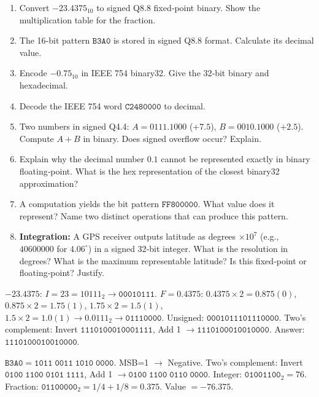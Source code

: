 \documentclass[11pt]{article}
\begin{document}
\begin{exercice}
\begin{enumerate}
    \item Convert $-23.4375_{10}$ to signed Q8.8 fixed‑point binary. Show the multiplication table for the fraction.
    \item The 16‑bit pattern $\mathtt{B3A0}$ is stored in signed Q8.8 format. Calculate its decimal value.
    \item Encode $-0.75_{10}$ in IEEE 754 binary32. Give the 32‑bit binary and hexadecimal.
    \item Decode the IEEE 754 word $\mathtt{C2480000}$ to decimal.
    \item Two numbers in signed Q4.4: $A = \mathtt{0111.1000}$ ($+7.5$), $B = \mathtt{0010.1000}$ ($+2.5$). Compute $A+B$ in binary. Does signed overflow occur? Explain.
    \item Explain why the decimal number $0.1$ cannot be represented exactly in binary floating‑point. What is the hex representation of the closest binary32 approximation?
    \item A computation yields the bit pattern $\mathtt{FF800000}$. What value does it represent? Name two distinct operations that can produce this pattern.
    \item \textbf{Integration:} A GPS receiver outputs latitude as degrees $\times 10^7$ (e.g., $40600000$ for $4.06^\circ$) in a signed 32‑bit integer. What is the resolution in degrees? What is the maximum representable latitude? Is this fixed‑point or floating‑point? Justify.
\end{enumerate}
\end{exercice}

\begin{corrige}[Exercise 1]
$-23.4375$: $I=23=10111_2 \to \mathtt{00010111}$. $F=0.4375$: $0.4375\times2=0.875(0)$, $0.875\times2=1.75(1)$, $1.75\times2=1.5(1)$, $1.5\times2=1.0(1) \to 0.0111_2 \to \mathtt{01110000}$. Unsigned: $\mathtt{0001011101110000}$. Two's complement: Invert $\mathtt{1110100010001111}$, Add 1 $\to \mathtt{1110100010010000}$. Answer: $\mathtt{1110100010010000}$.
\end{corrige}

\begin{corrige}[Exercise 2]
$\mathtt{B3A0} = \mathtt{1011\;0011\;1010\;0000}$. MSB=1 $\to$ Negative. Two's complement: Invert $\mathtt{0100\;1100\;0101\;1111}$, Add 1 $\to \mathtt{0100\;1100\;0110\;0000}$. Integer: $\mathtt{01001100}_2 = 76$. Fraction: $\mathtt{01100000}_2 = 1/4+1/8 = 0.375$. Value $= -76.375$.
\end{corrige}
\end{document}
